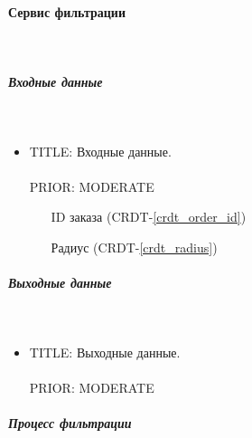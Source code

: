 \paragraph{Сервис фильтрации} \mbox{} \\ \label{driver_filters_taxi_service}

      \subparagraph{Входные данные} \mbox{} \\ \label{driver_filters_taxi_service_input_data}

        \begin{itemize}

          \item{

            TITLE: Входные данные.\\
            \\
            PRIOR: MODERATE\\

          }

          \begin{itemize}
            \item [ID заказа] (CRDT-\ref{crdt_order_id})
            \item [Радиус] (CRDT-\ref{crdt_radius})
          \end{itemize}

        \end{itemize}

      \subparagraph{Выходные данные} \mbox{} \\

        \begin{itemize}

          \item{

            TITLE: Выходные данные.\\
            \\
            PRIOR: MODERATE\\

          }

        \end{itemize}

      \subparagraph{Процесс фильтрации} \mbox{} \\

